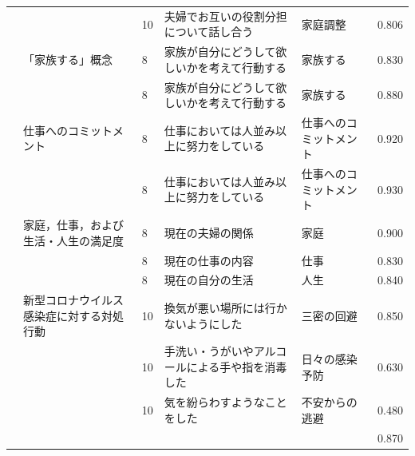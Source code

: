 \begin{landscape}
\begin{longtable}{p{2cm}p{2cm}p{2cm}p{6cm}p{2cm}p{2cm}}
		                         &                                  & 10  & 夫婦でお互いの役割分担について話し合う                                 & 家庭調整                 & 0.806      \\
		                         & 「家族する」概念                         & 8   & 家族が自分にどうして欲しいかを考えて行動する                              & 家族する                 & 0.830      \\
		                         &                                  & 8   & 家族が自分にどうして欲しいかを考えて行動する                              & 家族する                 & 0.880      \\
		                         & 仕事へのコミットメント                      & 8   & 仕事においては人並み以上に努力をしている                                & 仕事へのコミットメント          & 0.920      \\
		                         &                                  & 8   & 仕事においては人並み以上に努力をしている                                & 仕事へのコミットメント          & 0.930      \\
		                         & 家庭，仕事，および生活・人生の満足度               & 8   & 現在の夫婦の関係                                            & 家庭                   & 0.900      \\
		                         &                                  & 8   & 現在の仕事の内容                                            & 仕事                   & 0.830      \\
		                         &                                  & 8   & 現在の自分の生活                                            & 人生                   & 0.840      \\
		\textcite{Koiwa202192}      & 新型コロナウイルス感染症に対する対処行動             & 10  & 換気が悪い場所には行かないようにした                                  & 三密の回避                & 0.850      \\
		                         &                                  & 10  & 手洗い・うがいやアルコールによる手や指を消毒した                            & 日々の感染予防              & 0.630      \\
		                         &                                  & 10  & 気を紛らわすようなことをした                                      & 不安からの逃避              & 0.480      \\
		                         &                                  &     &                                                     &                      & 0.870      \\

\end{longtable}
\end{landscape}
